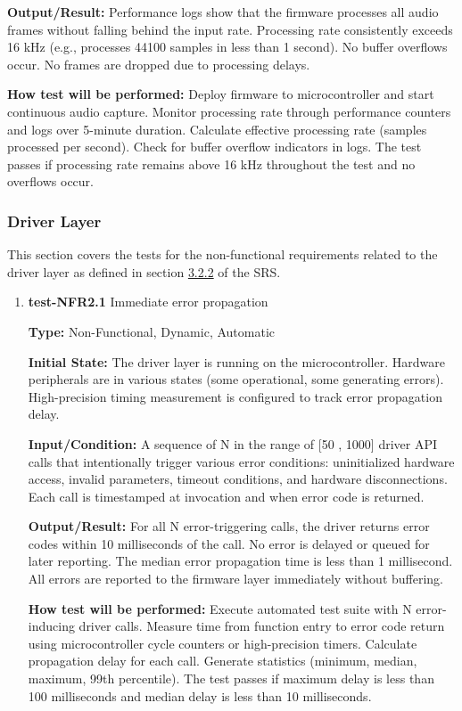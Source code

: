 \documentclass[12pt, titlepage]{article}
\begin{document}
\begin{enumerate}
\textbf{Output/Result:} 
Performance logs show that the firmware processes all audio frames without falling 
behind the input rate. Processing rate consistently exceeds 16 kHz (e.g., 
processes 44100 samples in less than 1 second). No buffer overflows occur. No 
frames are dropped due to processing delays.
					
\textbf{How test will be performed:} 
Deploy firmware to microcontroller and start continuous audio capture. Monitor 
processing rate through performance counters and logs over 5-minute duration. 
Calculate effective processing rate (samples processed per second). Check for 
buffer overflow indicators in logs. The test passes if processing rate remains 
above 16 kHz throughout the test and no overflows occur.

\end{enumerate}

\subsubsection{Driver Layer}

This section covers the tests for the non-functional requirements related to the 
driver layer as defined in section \hyperref[SRS-sec:FR2]{3.2.2} of the SRS.

\begin{enumerate}

\item{\textbf{test-NFR2.1} Immediate error propagation\\}

\textbf{Type:} Non-Functional, Dynamic, Automatic
					
\textbf{Initial State:} 
The driver layer is running on the microcontroller. Hardware peripherals are in 
various states (some operational, some generating errors). High-precision timing 
measurement is configured to track error propagation delay.
					
\textbf{Input/Condition:} 
A sequence of N in the range of [50 , 1000] driver API calls that 
intentionally trigger various error 
conditions: uninitialized hardware access, invalid parameters, timeout 
conditions, 
and hardware disconnections. Each call is timestamped at invocation and when 
error code is returned.
					
\textbf{Output/Result:} 
For all N error-triggering calls, the driver returns error codes within 10 
milliseconds of the call. No error is delayed or queued for later reporting. 
The median error propagation time is less than 1 millisecond. All errors are 
reported to the firmware layer immediately without buffering.
					
\textbf{How test will be performed:} 
Execute automated test suite with N error-inducing driver calls. Measure time 
from function entry to error code return using microcontroller cycle counters or 
high-precision timers. Calculate propagation delay for each call. Generate 
statistics (minimum, median, maximum, 99th percentile). The test passes 
if maximum delay is less than 100 milliseconds and median delay is 
less than 10 milliseconds.

\end{enumerate}
		
\end{document}
